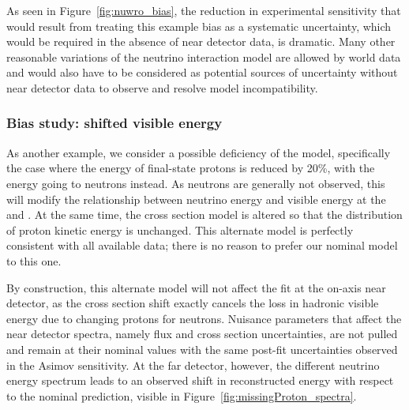 As seen in Figure~\ref{fig:nuwro_bias}, the reduction in experimental sensitivity that would result from treating this example bias as a systematic uncertainty, which would be required in the absence of near detector data, is dramatic. Many other reasonable variations of the neutrino interaction model are allowed by world data and would also have to be considered as potential sources of uncertainty without near detector data to observe and resolve model incompatibility. 

\subsubsection{Bias study: shifted visible energy}
\label{sec:missingProtonMD}

As another example, we consider a possible deficiency of the  model, specifically the case where the energy of final-state protons is reduced by 20\%, with the energy going to neutrons instead. As neutrons are generally not observed, this will modify the relationship between neutrino energy and visible energy at the  and . At the same time, the cross section model is altered so that the distribution of proton kinetic energy is unchanged. This alternate model is perfectly consistent with all available data; there is no reason to prefer our nominal  model to this one.

By construction, this alternate model will not affect the fit at the on-axis near detector, as the cross section shift exactly cancels the loss in hadronic visible energy due to changing protons for neutrons. Nuisance parameters that affect the near detector spectra, namely flux and cross section uncertainties, are not pulled and remain at their nominal values with the same post-fit uncertainties observed in the Asimov sensitivity. At the far detector, however, the different neutrino energy spectrum leads to an observed shift in reconstructed energy with respect to the nominal prediction, visible in Figure~\ref{fig:missingProton_spectra}.


